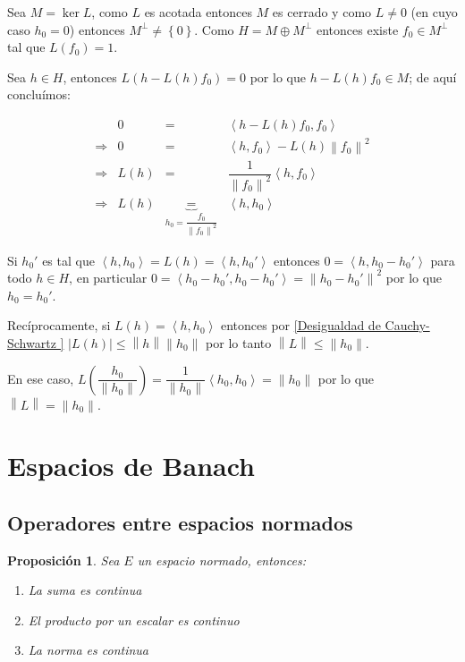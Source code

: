 \documentclass[11pt]{article}
\newcommand{\norm}[1]{\left\lVert#1\right\rVert}
\newcommand{\abs}[1]{\left\lvert#1\right\rvert}
\newcommand{\ip}[1]{\left\langle#1\right\rangle}
\newcommand{\sett}[1]{\left\lbrace#1\right\rbrace}
\numberwithin{theorem}{subsection}
\newtheorem{proposition}[theorem]{Proposici\'on}
\newenvironment{proof}[1][Demostraci\'on]{\begin{trivlist}
		\item[\hskip \labelsep {\bfseries #1}]}{\end{trivlist}}
\newcommand{\qed}{\nobreak \ifvmode \relax \else
	\ifdim\lastskip<1.5em \hskip-\lastskip
	\hskip1.5em plus0em minus0.5em \fi \nobreak
	\vrule height0.75em width0.5em depth0.25em\fi}
\begin{document}
\begin{proof}
	Sea $M = \ker L$, como $L$ es acotada entonces $M$ es cerrado y como $L \neq 0$ (en cuyo caso $h_0 = 0$) entonces $M^{\perp} \neq \sett{0}$. Como $H = M \oplus M^{\perp}$ entonces existe $f_0 \in M^{\perp}$ tal que $L(f_0) = 1$.
	
	Sea $h \in H$, entonces $L(h - L(h)f_0) = 0$ por lo que $h - L(h)f_0 \in M$; de aqu\'i conclu\'imos:
	
	\begin{equation*}
	\begin{array}{cccc}
	& 0 & = & \ip{h - L(h)f_0, f_0} \\
	\Longrightarrow & 0 & = & \ip{h,f_0} - L(h)\norm{f_0}^2 \\
	\Longrightarrow & L(h) & = & \dfrac{1}{\norm{f_0}^2}\ip{h,f_0} \\
	\Longrightarrow & L(h) & \underbrace{=}_{h_0 = \dfrac{f_0}{\norm{f_0}^2}} & \ip{h,h_0} 
	\end{array}
	\end{equation*}
	
	Si $h_0'$ es tal que $\ip{h,h_0} = L(h) = \ip{h,h_0'}$ entonces $0 = \ip{h,h_0 - h_0'}$ para todo $h \in H$, en particular $0 = \ip{h_0 - h_0',h_0 - h_0'} = \norm{h_0 - h_0'}^2$ por lo que $h_0 = h_0'$.
	
	Rec\'iprocamente, si $L(h) = \ip{h,h_0}$ entonces por \ref{Desigualdad de Cauchy-Schwartz } $\abs{L(h)} \leq \norm{h} \norm{h_0}$ por lo tanto $\norm{L} \leq \norm{h_0}$.
	
	En ese caso, $L\left(\dfrac{h_0}{\norm{h_0}}\right) = \dfrac{1}{\norm{h_0}}\ip{h_0,h_0} = \norm{h_0}$ por lo que $\norm{L} = \norm{h_0}$. \qed
	
\end{proof}

\section{Espacios de Banach}

\subsection{Operadores entre espacios normados}

\begin{proposition}
	\label{La norma es continua}
	Sea $E$ un espacio normado, entonces:
	
	\begin{enumerate}
		\item La suma es continua
		\item El producto por un escalar es continuo
		\item La norma es continua
	\end{enumerate}
\end{proposition}
\end{document}
